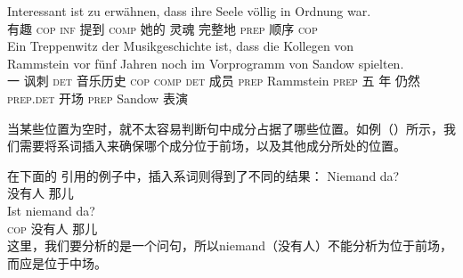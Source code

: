 \ex
\gll Interessant ist zu erwähnen, dass ihre Seele völlig in Ordnung war.\\
	 有趣 \textsc{cop} \textsc{inf} 提到 \textsc{comp} 她的 灵魂 完整地 \textsc{prep} 顺序 \textsc{cop}\\
\ex %
\gll Ein Treppenwitz der Musikgeschichte ist, dass die Kollegen von~~~~~~~~~~~ Rammstein vor fünf Jahren noch im Vorprogramm von Sandow spielten.\hspace{-5pt}\\
	 一 讽刺 \textsc{det} 音乐历史 \textsc{cop} \textsc{comp} \textsc{det} 成员 \textsc{prep} Rammstein \textsc{prep} 五 年 仍然 \textsc{prep}.\textsc{det} 开场 \textsc{prep} Sandow 表演\\
\zl

当某些位置为空时，就不太容易判断句中成分占据了哪些位置。如例（）所示，我们需要将系词插入来确保哪个成分位于前场，以及其他成分所处的位置。

在下面的 \citet[]{Paul1919a}引用的例子中，插入系词则得到了不同的结果：
\eal
\ex 
\gll Niemand da?\\
	 没有人 那儿\\
\ex 
\gll Ist niemand da?\\
	 \textsc{cop} 没有人 那儿\\
\zl
这里，我们要分析的是一个问句，所以niemand（没有人）不能分析为位于前场，而应是位于中场。

